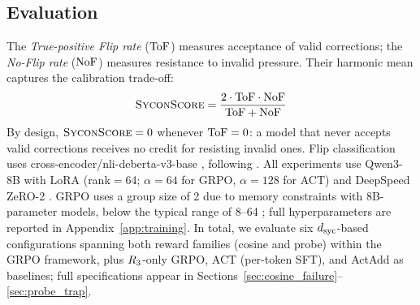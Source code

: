 \subsection{Evaluation}
\label{ssec:eval}

The \emph{True-positive Flip rate} ($\text{ToF}$) measures acceptance of valid corrections; the \emph{No-Flip rate} ($\text{NoF}$) measures resistance to invalid pressure.
Their harmonic mean captures the calibration trade-off:
\begin{equation}
\label{eq:sycon}
\textsc{SyconScore} = \frac{2 \cdot \text{ToF} \cdot \text{NoF}}{\text{ToF} + \text{NoF}}
\end{equation}
By design, $\textsc{SyconScore} = 0$ whenever $\text{ToF} = 0$: a model that never accepts valid corrections receives no credit for resisting invalid ones.
Flip classification uses cross-encoder/nli-deberta-v3-base \citep{he2023debertav3}, following \citet{consistency2025bctact}.
All experiments use Qwen3-8B \citep{yang2025qwen3} with LoRA \citep{hu2022lora} (rank$=$64; $\alpha{=}64$ for GRPO, $\alpha{=}128$ for ACT) and DeepSpeed ZeRO-2 \citep{rajbhandari2020zero}.
GRPO uses a group size of 2 due to memory constraints with 8B-parameter models, below the typical range of 8--64 \citep{shao2024grpo}; full hyperparameters are reported in Appendix~\ref{app:training}.
In total, we evaluate six $d_{\text{syc}}$-based configurations spanning both reward families (cosine and probe) within the GRPO framework, plus $R_3$-only GRPO, ACT (per-token SFT), and ActAdd as baselines; full specifications appear in Sections~\ref{sec:cosine_failure}--\ref{sec:probe_trap}.
